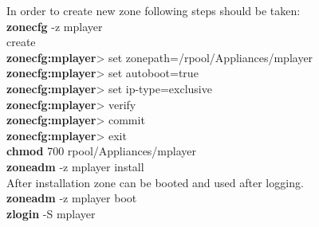 \documentclass[11pt]{book}
\begin{document}
        In order to create new zone following steps should be taken: \\

        \textbf{zonecfg} -z mplayer \\

        create \\

        \textbf{zonecfg:mplayer}> set zonepath=/rpool/Appliances/mplayer \\

        \textbf{zonecfg:mplayer}> set autoboot=true \\

        \textbf{zonecfg:mplayer}> set ip-type=exclusive \\

        \textbf{zonecfg:mplayer}> verify \\

        \textbf{zonecfg:mplayer}> commit \\

        \textbf{zonecfg:mplayer}> exit \\

        \textbf{chmod} 700 rpool/Appliances/mplayer \\

        \textbf{zoneadm} -z mplayer install \\

        After installation zone can be booted and used after logging. \\

        \textbf{zoneadm} -z mplayer boot \\

        \textbf{zlogin} -S mplayer \\

        

\end{document}
